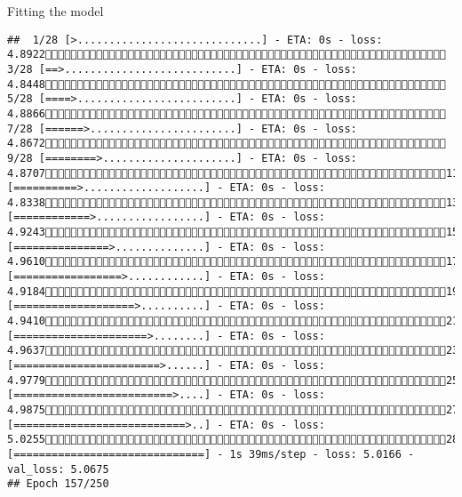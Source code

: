 \documentclass[
  ignorenonframetext,
]{beamer}
\begin{document}
\begin{frame}[fragile]{Fitting the model}
\begin{verbatim}
##  1/28 [>.............................] - ETA: 0s - loss: 4.8922 3/28 [==>...........................] - ETA: 0s - loss: 4.8448 5/28 [====>.........................] - ETA: 0s - loss: 4.8866 7/28 [======>.......................] - ETA: 0s - loss: 4.8672 9/28 [========>.....................] - ETA: 0s - loss: 4.870711/28 [==========>...................] - ETA: 0s - loss: 4.833813/28 [============>.................] - ETA: 0s - loss: 4.924315/28 [===============>..............] - ETA: 0s - loss: 4.961017/28 [=================>............] - ETA: 0s - loss: 4.918419/28 [===================>..........] - ETA: 0s - loss: 4.941021/28 [=====================>........] - ETA: 0s - loss: 4.963723/28 [=======================>......] - ETA: 0s - loss: 4.977925/28 [=========================>....] - ETA: 0s - loss: 4.987527/28 [===========================>..] - ETA: 0s - loss: 5.025528/28 [==============================] - 1s 39ms/step - loss: 5.0166 - val_loss: 5.0675
## Epoch 157/250

\end{verbatim}
\end{frame}
\end{document}

